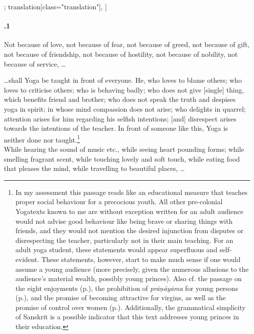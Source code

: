 \begin{alignment}[
  texts=edition[class="edition"];
  translation[class="translation"],
  ]
\begin{translation}
\begin{tlate}[58_1]
      \paragraph{.1 } Not because of love, not because of fear, not because of greed, not because of gift, not because of friendship, not because of hostility, not because of nobility, not because of service, \ldots\\
    \end{tlate}
    \begin{tlate}[p58_02]
      \ldots shall Yoga be taught in front of everyone. He, who loves to blame others; who loves to criticise others; who is behaving badly; who does not give [single] thing, which benefits friend and brother; who does not speak the truth and despises yoga in spirit; in whose mind compassion does not arise; who delights in quarrel; attention arises for him regarding his selfish intentions; [and] disrespect arises towards the intentions of the teacher. In front of someone like this, Yoga is neither done nor taught.\footnote{In my assessment this passage reads like an educational measure that teaches proper social behaviour for a precocious youth. All other pre-colonial Yogatexts known to me are without exception written for an adult audience would not advise good behaviour like being brave or sharing things with friends, and they would not mention the desired injunction from disputes or disrespecting the teacher, particularly not in their main teaching. For an adult yoga student, these statements would appear superfluous and self-evident. These statements, however, start to make much sense if one would assume a young audience (more precisely, given the numerous allusions to the audience's material wealth, possibly young princes). Also cf. the passage on the eight enjoyments (p.\label{eightenjoyments}), the prohibition of \textit{prāṇāyāma} for young persons (p.\pageref{ashtanga}), and the promise of becoming attractive for virgins, as well as the promise of control over women (p.\pageref{women}). Additionally, the grammatical simplicity of Sanskrit is a possible indicator that this text addresses young princes in their education.} \\

While hearing the sound of music etc., while seeing heart pounding forms; while smelling fragrant scent, while touching lovely and soft touch, while eating food that pleases the mind, while travelling to beautiful places, \ldots
    \end{tlate}
  \end{translation}
\end{alignment}
